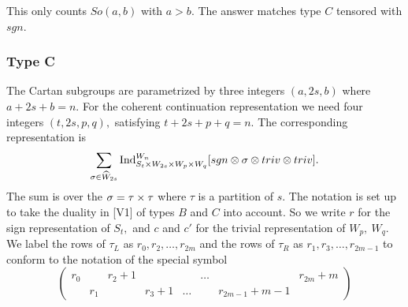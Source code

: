 \documentclass[11pt ,reqno]{amsart}
\begin{document}
{
  \begin{remark*}
This only counts  $So(a,b)$ with $a>b.$ The answer matches type $C$
tensored with $sgn$.  
  \end{remark*}
}


\subsubsection{Type C}\label{2.2} The Cartan subgroups are parametrized by
three integers $(a,2s,b)$ where $a+2s+b=n.$ For the coherent
continuation representation we need four integers $(t,2s,p,q),$
satisfying $t+2s+p+q=n.$ The corresponding representation is 
\begin{equation}
\sum_{{\sigma}\in\widehat{W}_{2s}} \operatorname{Ind}_{S_t\times W_{2s}\times W_p\times W_q}
^{W_n}[sgn\otimes{\sigma}\otimes triv\otimes triv].
\label{2.2.1}\end{equation}
The sum is over the ${\sigma}=\tau\times\tau$ where $\tau$ is a partition
of $s.$ The notation is set up to take the duality in [V1] of types $B$ and
$C$ into account. So we write $r$ for the sign representation of
$S_t,$ and $c$ and $c'$ for the trivial representation of $W_p,\ W_q.$
We label the rows of $\tau_L$ as $r_0,r_2,\dots ,r_{2m}$ and the rows of
$\tau_R$ as $r_1,r_3,\dots ,r_{2m-1}$ to conform to the notation of the
special symbol
\begin{equation}
\begin{pmatrix} r_0&   &r_2+1&     &      &\dots       &            &r_{2m}+m\\
            &r_1&     &r_3+1&\dots &            &r_{2m-1}+m-1&       \end{pmatrix}
          \label{2.2.2}\end{equation}
\end{document}
